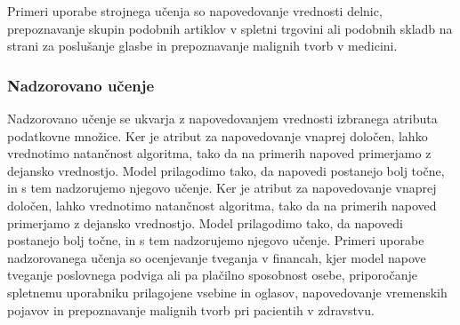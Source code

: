 \documentclass[12pt,a4paper,twoside]{article}
\theoremstyle{definition} %
\theoremstyle{plain} %
\numberwithin{equation}{section}  %
\begin{document}
Primeri uporabe strojnega učenja so napovedovanje vrednosti delnic, prepoznavanje skupin podobnih artiklov v spletni trgovini ali podobnih skladb na strani za poslušanje glasbe in prepoznavanje malignih tvorb v medicini.


\subsubsection{Nadzorovano učenje}

Nadzorovano učenje se ukvarja z napovedovanjem vrednosti izbranega atributa podatkovne množice.
Ker je atribut za napovedovanje vnaprej določen, lahko vrednotimo natančnost algoritma, tako da na primerih napoved primerjamo z dejansko vrednostjo. 
Model prilagodimo tako, da napovedi postanejo bolj točne, in s tem nadzorujemo njegovo učenje.
Ker je atribut za napovedovanje vnaprej določen, lahko vrednotimo natančnost algoritma, tako da na primerih napoved primerjamo z dejansko vrednostjo. 
Model prilagodimo tako, da napovedi postanejo bolj točne, in s tem nadzorujemo njegovo učenje. 
Primeri uporabe nadzorovanega učenja so ocenjevanje tveganja v financah, kjer model napove tveganje poslovnega podviga ali pa plačilno sposobnost osebe, 
priporočanje spletnemu uporabniku prilagojene vsebine in oglasov, napovedovanje vremenskih pojavov in prepoznavanje malignih tvorb pri pacientih v zdravstvu.
\end{document}
